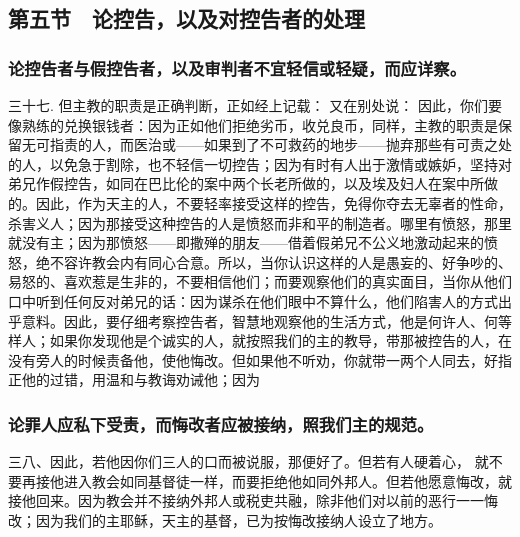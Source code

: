 
\subsection{第五节　论控告，以及对控告者的处理}


\subsubsection{论控告者与假控告者，以及审判者不宜轻信或轻疑，而应详察。}

三十七. 但主教的职责是正确判断，正如经上记载： 又在别处说： 因此，你们要像熟练的兑换银钱者：因为正如他们拒绝劣币，收兑良币，同样，主教的职责是保留无可指责的人，而医治或——如果到了不可救药的地步——抛弃那些有可责之处的人，以免急于割除，也不轻信一切控告；因为有时有人出于激情或嫉妒，坚持对弟兄作假控告，如同在巴比伦的案中两个长老所做的，以及埃及妇人在案中所做的。因此，作为天主的人，不要轻率接受这样的控告，免得你夺去无辜者的性命，杀害义人；因为那接受这种控告的人是愤怒而非和平的制造者。哪里有愤怒，那里就没有主；因为那愤怒——即撒殚的朋友——借着假弟兄不公义地激动起来的愤怒，绝不容许教会内有同心合意。所以，当你认识这样的人是愚妄的、好争吵的、易怒的、喜欢惹是生非的，不要相信他们；而要观察他们的真实面目，当你从他们口中听到任何反对弟兄的话：因为谋杀在他们眼中不算什么，他们陷害人的方式出乎意料。因此，要仔细考察控告者，智慧地观察他的生活方式，他是何许人、何等样人；如果你发现他是个诚实的人，就按照我们的主的教导，带那被控告的人，在没有旁人的时候责备他，使他悔改。但如果他不听劝，你就带一两个人同去，好指正他的过错，用温和与教诲劝诫他；因为\par


\subsubsection{论罪人应私下受责，而悔改者应被接纳，照我们主的规范。}

三八、因此，若他因你们三人的口而被说服，那便好了。但若有人硬着心，  就不要再接他进入教会如同基督徒一样，而要拒绝他如同外邦人。但若他愿意悔改，就接他回来。因为教会并不接纳外邦人或税吏共融，除非他们对以前的恶行一一悔改；因为我们的主耶稣，天主的基督，已为按悔改接纳人设立了地方。\par

